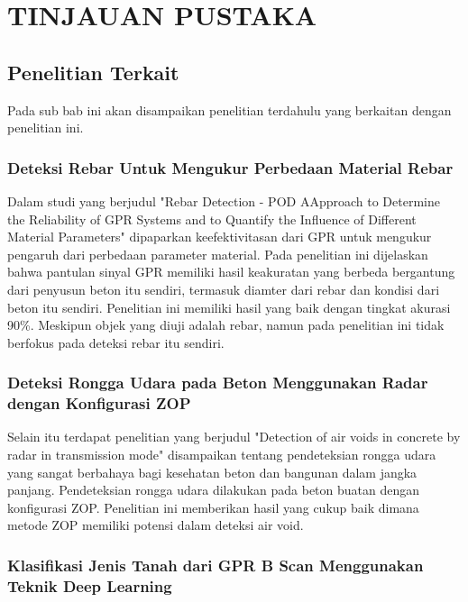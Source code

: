 \chapter{TINJAUAN PUSTAKA}
\label{chap:tinjauanpustaka}


\section{Penelitian Terkait}
\label{sec:penelitianterdahulu}
Pada sub bab ini akan disampaikan penelitian terdahulu yang berkaitan dengan penelitian ini.
\subsection{Deteksi Rebar Untuk Mengukur Perbedaan Material Rebar}

Dalam studi yang berjudul "Rebar Detection - POD AApproach to Determine the Reliability of GPR Systems and to Quantify the Influence of Different Material Parameters" \parencite{Feistkorn2016} dipaparkan keefektivitasan dari GPR untuk mengukur pengaruh dari perbedaan parameter material. Pada penelitian ini dijelaskan bahwa pantulan sinyal GPR memiliki hasil keakuratan yang berbeda bergantung dari penyusun beton itu sendiri, termasuk diamter dari rebar dan kondisi dari beton itu sendiri. Penelitian ini memiliki hasil yang baik dengan tingkat akurasi 90\%. Meskipun objek yang diuji adalah rebar, namun pada penelitian ini tidak berfokus pada deteksi rebar itu sendiri.

\subsection{Deteksi Rongga Udara pada Beton Menggunakan Radar dengan Konfigurasi ZOP}

Selain itu terdapat penelitian yang berjudul "Detection of air voids in concrete by radar in transmission mode" \parencite{Trela2015} disampaikan tentang pendeteksian rongga udara yang sangat berbahaya bagi kesehatan beton dan bangunan dalam jangka panjang. Pendeteksian rongga udara dilakukan pada beton buatan dengan konfigurasi ZOP. Penelitian ini memberikan hasil yang cukup baik dimana metode ZOP memiliki potensi dalam deteksi air void.

\subsection{Klasifikasi Jenis Tanah dari GPR B Scan Menggunakan Teknik Deep Learning}

